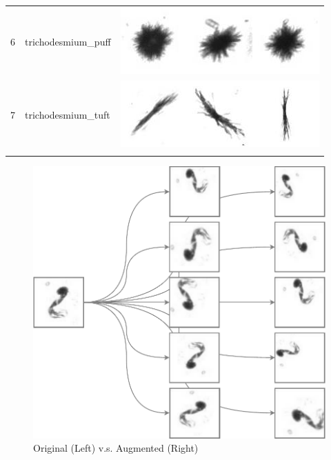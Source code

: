 \documentclass[11pt,oneside,a4paper]{article}
\numberwithin{equation}{section}
\begin{document}
\begin{table}[p]
\begin{tabular}{m{3pt} m{130pt} m{120pt}}
6 & trichodesmium\_puff & \includegraphics[scale=0.4]{./fig/trichodesmium_puff.png}\\
7 & trichodesmium\_tuft & \includegraphics[scale=0.4]{./fig/trichodesmium_tuft.png}\\
\bottomrule
\label{sample from dataset}
\end{tabular}
\end{table}

\begin{figure}[p]
\centering
\small
\includegraphics[width=.6\linewidth]{fig/CSci-5525-data-augmentation-crop.pdf}
\caption{Original (Left) v.s. Augmented (Right)}
\label{augmentation}
\end{figure}
\end{document}
